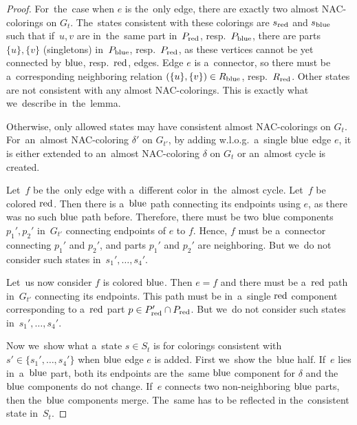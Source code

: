 \begin{proof}
	For~the~case when \( e \) is the~only edge,
	there are exactly two almost NAC-colorings on \( G_t \).
	The~states consistent with these colorings are \( s_{\text{red}} \) and \( s_{\text{blue}} \)
	such that if~\( u, v \) are in~the~same part in~\( P_{\text{red}} \), resp.\ \( P_{\text{blue}} \),
	there are parts \( \{u\}, \{v\} \) (singletons) in~\( P_{\text{blue}} \), resp.\ \( P_{\text{red}} \),
	as these vertices cannot be yet connected by \( \text{blue} \), resp.\ \( \text{red} \), edges.
	Edge \( e \) is a~connector, so there must be a~corresponding neighboring
	relation \( (\{u\}, \{v\}) \in R_{\text{blue}} \), resp.\ \( R_{\text{red}} \).
	Other states are not consistent with any almost NAC-colorings.
	This is exactly what we~describe in~the~lemma.

	Otherwise, only allowed states may have consistent almost NAC-colorings on \( G_t \).
	For~an~almost NAC-coloring \( \delta' \) on \( G_{t'} \),
	by adding w.l.o.g.\ a~single \( \text{blue} \) edge \( e \),
	it is either extended to an~almost NAC-coloring \( \delta \) on \( G_t \)
	or an~almost cycle is created.

	Let~\( f \) be the~only edge with a~different color in~the~almost cycle.
	Let~\( f \) be colored \( \text{red} \).
	Then there is a~\( \text{blue} \) path connecting its endpoints using \( e \),
	as there was no such \( \text{blue} \) path before.
	Therefore, there must be two \( \text{blue} \) components \( p_1', p_2' \) in~\( G_{t'} \)
	connecting endpoints of \( e \) to \( f \).
	Hence, \( f \) must be a~connector connecting \( p_1' \) and \( p_2' \),
	and parts \( p_1' \) and \( p_2' \) are neighboring.
	But we~do not consider such states in~\( s_1', \dots, s_4' \).

	Let~us now consider \( f \) is colored \( \text{blue} \).
	Then \( e = f \) and
	there must be a~\( \text{red} \) path in~\( G_{t'} \) connecting its endpoints.
	This path must be in~a~single \( \text{red} \) component corresponding
	to a~\( \text{red} \) part \( p \in P_{\text{red}}' \cap P_{\text{red}} \).
	But we~do not consider such states in~\( s_1', \dots, s_4' \).

	Now we~show what a~state \( s \in S_t \) is
	for colorings consistent with \( s' \in \{s_1', \dots, s_4'\} \)
	when \( \text{blue} \) edge \( e \) is added.
	First we~show the~blue half.
	If~\( e \) lies in~a~\( \text{blue} \) part,
	both its endpoints are the~same \( \text{blue} \) component
	for \( \delta \) and the~\( \text{blue} \) components do not change.
	If~\( e \) connects two non-neighboring \( \text{blue} \) parts,
	then the~\( \text{blue} \) components merge. The~same has to be reflected in
	the~consistent state in~\( S_t \).


\end{proof}
